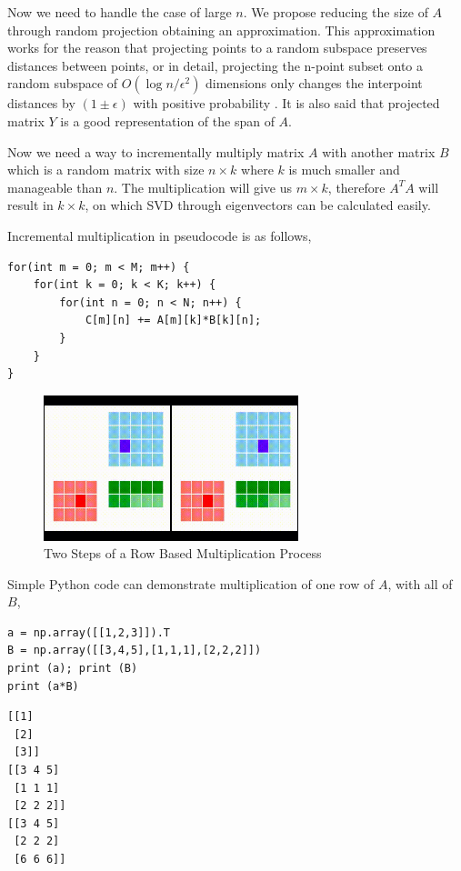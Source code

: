 \documentclass{article}
\begin{document}
Now we need to handle the case of large $n$. We propose reducing the size of $A$
through random projection obtaining an approximation. This approximation works
for the reason that projecting points to a random subspace preserves distances
between points, or in detail, projecting the n-point subset onto a random
subspace of $O(\log n/\epsilon^2)$ dimensions only changes the interpoint
distances by $(1 \pm \epsilon)$ with positive probability \cite{gupta}. It is
also said that projected matrix $Y$ is a good representation of the span of $A$.

Now we need a way to incrementally multiply matrix $A$ with another matrix $B$
which is a random matrix with size $n \times k$ where $k$ is much smaller and
manageable than $n$. The multiplication will give us $m \times k$, therefore
$A^TA$ will result in $k \times k$, on which SVD through eigenvectors can be
calculated easily.

Incremental multiplication in pseudocode is as follows,

\begin{verbatim}
for(int m = 0; m < M; m++) {
    for(int k = 0; k < K; k++) {
        for(int n = 0; n < N; n++) {
            C[m][n] += A[m][k]*B[k][n];
        }
    }
}
\end{verbatim}

\begin{figure}[h]
  \centering
  \includegraphics[width=20em]{mult1.jpg}
  \caption{Two Steps of a Row Based Multiplication Process}
  \label{fig:mult1}
\end{figure}

Simple Python code can demonstrate multiplication of one row of $A$,
with all of $B$,

\begin{verbatim}
a = np.array([[1,2,3]]).T
B = np.array([[3,4,5],[1,1,1],[2,2,2]])
print (a); print (B)
print (a*B)
\end{verbatim}

\begin{verbatim}
[[1]
 [2]
 [3]]
[[3 4 5]
 [1 1 1]
 [2 2 2]]
[[3 4 5]
 [2 2 2]
 [6 6 6]]
\end{verbatim}
\end{document}
